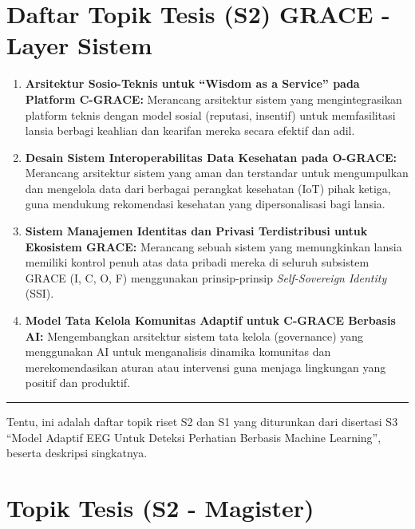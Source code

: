 \documentclass[
  letterpaper,
  DIV=11,
  numbers=noendperiod]{scrreprt}
\begin{document}
\section{\texorpdfstring{\textbf{Daftar Topik Tesis (S2) GRACE - Layer
Sistem}}{Daftar Topik Tesis (S2) GRACE - Layer Sistem}}\label{daftar-topik-tesis-s2-grace---layer-sistem}

\begin{enumerate}
\def\labelenumi{\arabic{enumi}.}
\item
  \textbf{Arsitektur Sosio-Teknis untuk ``Wisdom as a Service'' pada
  Platform C-GRACE:} Merancang arsitektur sistem yang mengintegrasikan
  platform teknis dengan model sosial (reputasi, insentif) untuk
  memfasilitasi lansia berbagi keahlian dan kearifan mereka secara
  efektif dan adil.
\item
  \textbf{Desain Sistem Interoperabilitas Data Kesehatan pada O-GRACE:}
  Merancang arsitektur sistem yang aman dan terstandar untuk
  mengumpulkan dan mengelola data dari berbagai perangkat kesehatan
  (IoT) pihak ketiga, guna mendukung rekomendasi kesehatan yang
  dipersonalisasi bagi lansia.
\item
  \textbf{Sistem Manajemen Identitas dan Privasi Terdistribusi untuk
  Ekosistem GRACE:} Merancang sebuah sistem yang memungkinkan lansia
  memiliki kontrol penuh atas data pribadi mereka di seluruh subsistem
  GRACE (I, C, O, F) menggunakan prinsip-prinsip \emph{Self-Sovereign
  Identity} (SSI).
\item
  \textbf{Model Tata Kelola Komunitas Adaptif untuk C-GRACE Berbasis
  AI:} Mengembangkan arsitektur sistem tata kelola (governance) yang
  menggunakan AI untuk menganalisis dinamika komunitas dan
  merekomendasikan aturan atau intervensi guna menjaga lingkungan yang
  positif dan produktif.
\end{enumerate}

\begin{center}\rule{0.5\linewidth}{0.5pt}\end{center}

Tentu, ini adalah daftar topik riset S2 dan S1 yang diturunkan dari
disertasi S3 ``Model Adaptif EEG Untuk Deteksi Perhatian Berbasis
Machine Learning'', beserta deskripsi singkatnya.

\section{\texorpdfstring{\textbf{Topik Tesis (S2 -
Magister)}}{Topik Tesis (S2 - Magister)}}\label{topik-tesis-s2---magister}
\end{document}

